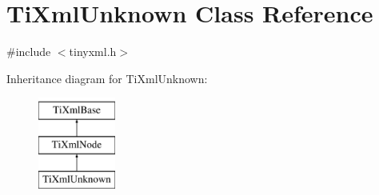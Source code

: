 \hypertarget{classTiXmlUnknown}{\section{\-Ti\-Xml\-Unknown \-Class \-Reference}
\label{classTiXmlUnknown}
}


{\ttfamily \#include $<$tinyxml.\-h$>$}

\-Inheritance diagram for \-Ti\-Xml\-Unknown\-:\begin{figure}[H]
\begin{center}
\leavevmode
\includegraphics[height=3.000000cm]{classTiXmlUnknown}
\end{center}
\end{figure}

